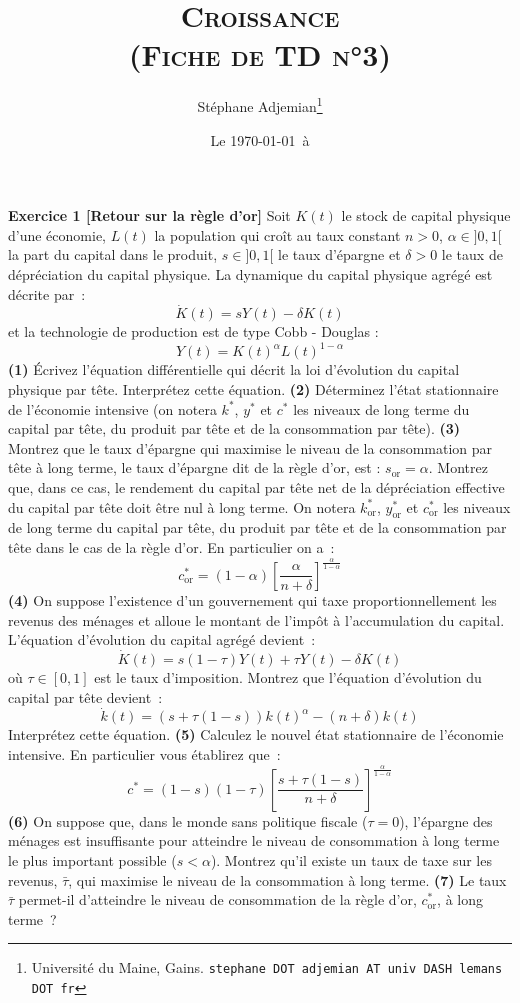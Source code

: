 \documentclass[12pt,a4paper,notitlepage,twocolumn]{article}
\title{\textsc{Croissance\\ \small{(Fiche de TD n°3)}}}
\author{Stéphane Adjemian\thanks{Université du Maine, Gains. \texttt{stephane DOT adjemian AT univ DASH lemans DOT fr}}}
\date{Le \today\ à \thistime}
\begin{document}
\maketitle

\noindent \textbf{Exercice 1 [Retour sur la règle d'or]} Soit $K(t)$ le stock de capital physique d'une économie,
$L(t)$ la population qui croît au taux constant $n>0$, $\alpha \in
]0,1[$ la part du capital dans le produit, $s \in ]0,1[$ le taux
d'épargne et $\delta>0$ le taux de dépréciation du capital physique.
La dynamique du capital physique agrégé est décrite par~:
\[
  \dot{K}(t) = s Y(t) - \delta K(t)
\]
et la technologie de production est de type Cobb - Douglas :
\[
  Y(t) = K(t)^{\alpha}L(t)^{1-\alpha}
\]
\textbf{(1)} Écrivez l'équation différentielle qui décrit la loi
d'évolution du capital physique par tête. Interprétez cette équation.
\textbf{(2)} Déterminez l'état stationnaire de l'économie intensive (on notera $k^{\ast}$,
$y^{\ast}$ et $c^{\ast}$ les niveaux de long terme du capital par
tête, du produit par tête et de la consommation par tête).
\textbf{(3)} Montrez que le taux d'épargne qui maximise le niveau de
la consommation par tête à long terme, le taux d'épargne dit de la
règle d'or, est : $s_{\mathrm{or}} = \alpha$. Montrez que, dans ce
cas, le rendement du capital par tête net de la dépréciation
effective du capital par tête doit être nul à long terme. On notera
$k^{\ast}_{\mathrm{or}}$, $y^{\ast}_{\mathrm{or}}$ et
$c^{\ast}_{\mathrm{or}}$ les niveaux de long terme du capital par
tête, du produit par tête et de la consommation par tête dans le cas
de la règle d'or. En particulier on a~:
\[
c^{\ast}_{\mathrm{or}} =
(1-\alpha)\left[\frac{\alpha}{n+\delta}\right]^{\frac{\alpha}{1-\alpha}}
\]
\textbf{(4)} On suppose l'existence d'un gouvernement qui taxe
proportionnellement les revenus des ménages et alloue le montant de
l'impôt à l'accumulation du capital. L'équation d'évolution du
capital agrégé devient~:
\[
  \dot{K}(t) = s(1-\tau) Y(t) + \tau Y(t) - \delta K(t)
\]
où $\tau \in [0,1]$ est le taux d'imposition. Montrez que l'équation
d'évolution du capital par tête devient~:
\[
  \dot{k}(t) = (s + \tau(1-s)) k(t)^{\alpha} - (n+\delta) k(t)
\]
Interprétez cette équation. \textbf{(5)} Calculez le nouvel état
stationnaire de l'économie intensive. En particulier vous établirez
que~:
\[
c^{\ast} = (1-s)(1-\tau)\left[\frac{s +
\tau(1-s)}{n+\delta}\right]^{\frac{\alpha}{1-\alpha}}
\]
\textbf{(6)} On suppose que, dans le monde sans politique fiscale
($\tau = 0$), l'épargne des ménages est insuffisante pour atteindre
le niveau de consommation à long terme le plus important possible
($s<\alpha$). Montrez qu'il existe un taux de taxe sur les revenus,
$\bar{\tau}$, qui maximise le niveau de la consommation à long
terme. \textbf{(7)} Le taux $\bar{\tau}$ permet-il d'atteindre le
niveau de consommation de la règle d'or, $c^{\ast}_{\mathrm{or}}$, à
long terme~?\newline
\end{document}
